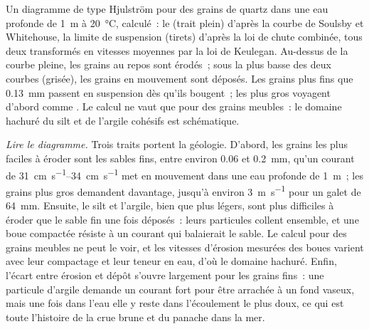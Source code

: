 \begin{omfigure}
{\small Un diagramme de type Hjulström pour des grains de quartz dans une eau
profonde de \qty{1}{m} à \qty{20}{\celsius}, calculé~: le  (trait plein)
d'après la courbe de Soulsby et Whitehouse, la limite de suspension (tirets) d'après
la loi de chute combinée, tous deux transformés en vitesses moyennes par la loi de Keulegan. Au-dessus de la courbe pleine, les grains
au repos sont érodés~; sous la plus basse des deux courbes (grisée), les grains en mouvement
sont déposés. Les grains plus fins que \qty{0.13}{mm} passent en suspension dès qu'ils
bougent~; les plus gros voyagent d'abord comme . Le calcul ne vaut que
pour des grains meubles~: le domaine hachuré du silt et de l'argile cohésifs est schématique.}
\label{fig:b1:erosion-transport:hjulstrom}
\end{omfigure}

\emph{Lire le diagramme.} Trois traits portent la géologie. D'abord, les
grains les plus faciles à éroder sont les sables fins, entre environ \num{0.06} et
\qty{0.2}{mm}, qu'un courant de \qtyrange{31}{34}{cm.s^{-1}} met en mouvement dans
une eau profonde de \qty{1}{m}~; les grains plus gros demandent davantage, jusqu'à environ
\qty{3}{m.s^{-1}} pour un galet de \qty{64}{mm}. Ensuite, le silt et l'argile, bien
que plus légers, sont plus difficiles à éroder que le sable fin une fois déposés~:
leurs particules collent ensemble, et une boue compactée résiste à un courant qui
balaierait le sable. Le calcul pour des grains meubles ne peut le voir, et
les vitesses d'érosion mesurées des boues varient avec leur compactage et leur teneur en
eau, d'où le domaine hachuré. Enfin, l'écart entre érosion et
dépôt s'ouvre largement pour les grains fins~: une particule d'argile demande un courant
fort pour être arrachée à un fond vaseux, mais une fois dans l'eau elle y reste dans
l'écoulement le plus doux, ce qui est toute l'histoire de la crue brune et du
panache dans la mer.

